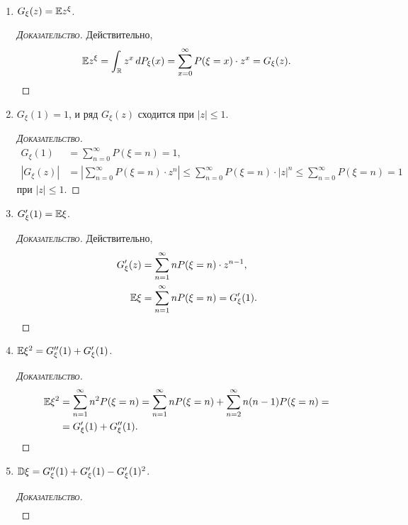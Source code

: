 \documentclass[../main.tex]{subfiles}
\begin{document}
\begin{prop}\
 \begin{enumerate}
  \item $G_\xi(z) = \mathbb E z^{\xi}$.
   \begin{proof}[\normalfont\textsc{Доказательство}]
    Действительно,
    \begin{align*}
     \mathbb E z^{\xi} = \int_{\mathbb{R}} z^x\,dP_\xi(x) = \sum_{x=0}^{\infty} P(\xi=x) \cdot z^{x} = G_\xi(z).
    \end{align*}
   \end{proof}
  \item $ G_\xi(1) = 1 $, и ряд $ G_\xi(z) $ сходится при $ \left| z \right| \leqslant 1 $.
   \begin{proof}[\normalfont\textsc{Доказательство}]
    \begin{align*}
     G_\xi(1) &= \sum_{n=0}^{\infty}P(\xi=n) = 1,\\
     \left| G_\xi(z) \right| &= \left| \sum_{n = 0}^\infty P(\xi = n) \cdot z^{n} \right| \leqslant \sum_{n = 0}^\infty P(\xi = n) \cdot |z|^{n} \leqslant \sum_{n = 0}^\infty P(\xi = n) = 1
    \end{align*} при $ \left| z \right| \leqslant 1 $.
   \end{proof}
  \item $ G'_\xi(1) = \mathbb E \xi $. 
   \begin{proof}[\normalfont\textsc{Доказательство}]
    Действительно,
    \begin{align*}
     G_\xi'(z) &= \sum_{n=1}^{\infty}nP(\xi = n) \cdot z^{n-1},\\
     \mathbb E\xi &= \sum_{n=1}^{\infty} nP(\xi=n) = G_\xi'(1).
    \end{align*}
   \end{proof}
  \item $ \mathbb E\xi^{2} = G''_\xi(1) + G'_\xi(1) $.
   \begin{proof}[\normalfont\textsc{Доказательство}]
    \begin{align*}
     \mathbb E\xi^{2} &= \sum_{n=1}^{\infty} n^{2}P(\xi = n) = \sum_{n=1}^{\infty} nP(\xi=n) + \sum_{n=2}^{\infty} n(n-1)P(\xi = n) = \\
     &= G'_\xi(1) + G''_\xi(1).
    \end{align*}
   \end{proof}
  \item $ \mathbb D\xi = G''_\xi(1) + G'_\xi(1) - G'_\xi(1)^{2} $.
   \begin{proof}[\normalfont\textsc{Доказательство}]
    \begin{align*}

\end{align*}
\end{proof}
\end{enumerate}
\end{prop}
\end{document}
